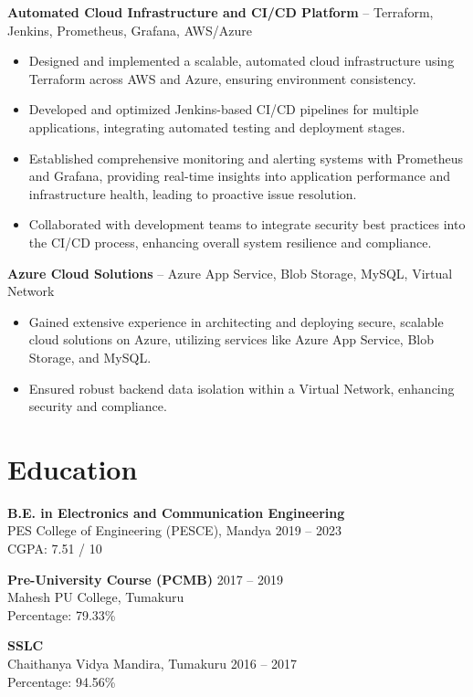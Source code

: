 \documentclass[a4paper,10pt]{article}
\begin{document}
	\textbf{Automated Cloud Infrastructure and CI/CD Platform} – Terraform, Jenkins, Prometheus, Grafana, AWS/Azure
\begin{itemize}[leftmargin=0.25in, label=\textbullet]
    \item Designed and implemented a scalable, automated cloud infrastructure using Terraform across AWS and Azure, ensuring environment consistency.
    \item Developed and optimized Jenkins-based CI/CD pipelines for multiple applications, integrating automated testing and deployment stages.
    \item Established comprehensive monitoring and alerting systems with Prometheus and Grafana, providing real-time insights into application performance and infrastructure health, leading to proactive issue resolution.
    \item Collaborated with development teams to integrate security best practices into the CI/CD process, enhancing overall system resilience and compliance.
\end{itemize}







\textbf{Azure Cloud Solutions} – Azure App Service, Blob Storage, MySQL, Virtual Network
\begin{itemize}[leftmargin=0.25in, label=\textbullet]
    \item Gained extensive experience in architecting and deploying secure, scalable cloud solutions on Azure, utilizing services like Azure App Service, Blob Storage, and MySQL.

    \item Ensured robust backend data isolation within a Virtual Network, enhancing security and compliance.
\end{itemize}

\section*{Education}
\textbf{B.E. in Electronics and Communication Engineering} \\
PES College of Engineering (PESCE), Mandya \hfill 2019 – 2023 \\
CGPA: 7.51 / 10

\textbf{Pre-University Course (PCMB)} \hfill 2017 – 2019 \\
Mahesh PU College, Tumakuru \\
Percentage: 79.33\%

\textbf{SSLC} \\
Chaithanya Vidya Mandira, Tumakuru \hfill 2016 – 2017 \\
Percentage: 94.56\%
\end{document}
